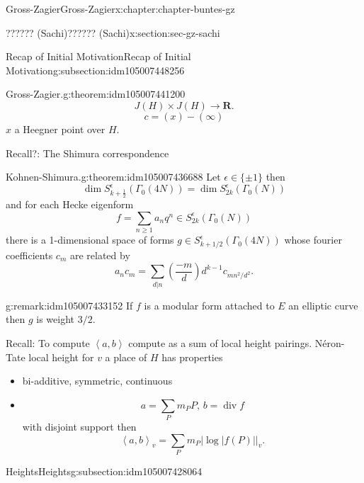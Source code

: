 \documentclass[oneside,10pt,]{book}
\numberwithin{equation}{section}
\newcommand{\legendre}[2]{\left(\frac{#1}{#2}\right)}
\newcommand{\pair}[2]{\left\langle #1, #2 \right\rangle}
\newcommand{\RR}{\mathbf{R}}
\DeclareMathOperator{\divisor}{div}
\begin{document}
\begin{chapterptx}{Gross-Zagier}{}{Gross-Zagier}{}{}{x:chapter:chapter-buntes-gz}
\begin{sectionptx}{?????? (Sachi)}{}{?????? (Sachi)}{}{}{x:section:sec-gz-sachi}
\begin{subsectionptx}{Recap of Initial Motivation}{}{Recap of Initial Motivation}{}{}{g:subsection:idm105007448256}
\begin{theorem}{Gross-Zagier.}{}{g:theorem:idm105007441200}
\begin{equation*}
J(H)\times J(H) \to \RR\text{.}
\end{equation*}
%
\begin{equation*}
c = (x) - (\infty )
\end{equation*}
\(x\) a Heegner point over \(H\).%
\end{theorem}
Recall?: The Shimura correspondence%
\begin{theorem}{Kohnen-Shimura.}{}{g:theorem:idm105007436688}%
Let \(\epsilon \in \{\pm 1\}\)  then%
\begin{equation*}
\dim S_{k+\frac{1}{2}}^\epsilon  (\Gamma_0 (4N)) = \dim S_{2k}^\epsilon (\Gamma _0(N))
\end{equation*}
and for each Hecke eigenform%
\begin{equation*}
f = \sum_{n\ge 1} a_n q^n\in S^\epsilon _{2k} (\Gamma _0(N))
\end{equation*}
there is a 1-dimensional space of  forms \(g \in S_{k+1/2}^\epsilon (\Gamma _0(4N))\) whose fourier coefficients  \(c_m\) are related by%
\begin{equation*}
a_n c_m= \sum _{d|n} \legendre{-m}d d^{k-1}c_{mn^2/d^2}\text{.}
\end{equation*}
%
\end{theorem}
\begin{remark}{}{g:remark:idm105007433152}%
If \(f \) is a modular form attached to \(E\) an elliptic curve then \(g\) is weight \(3/2\).%
\end{remark}
Recall: To compute \(\pair ab\) compute as a sum of local height pairings. Néron-Tate local height for \(v\) a place of \(H\) has properties%
\begin{itemize}[label=\textbullet]
\item{}bi-additive, symmetric, continuous%
\item{}%
\begin{equation*}
a=\sum_P m_P P,\,b = \divisor f
\end{equation*}
with disjoint support then%
\begin{equation*}
\pair ab_v = \sum_P m_P |\log |f(P)||_v\text{.}
\end{equation*}
%
\end{itemize}
%
\end{subsectionptx}
%
%
\typeout{************************************************}
\typeout{************************************************}
%
\begin{subsectionptx}{Heights}{}{Heights}{}{}{g:subsection:idm105007428064}

\end{subsectionptx}
\end{sectionptx}
\end{chapterptx}
\end{document}
